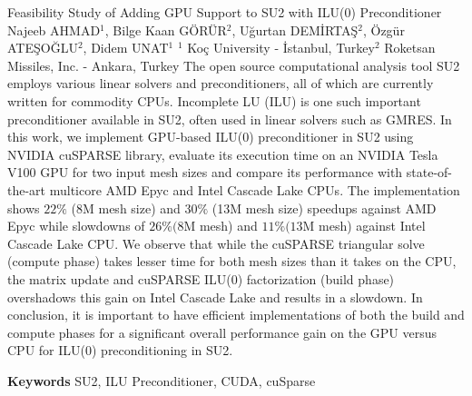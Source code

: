 
    \begin{abstract_online}{Feasibility Study of Adding GPU Support to SU2 with ILU(0) Preconditioner}{%
        Najeeb AHMAD$^{1}$, Bilge Kaan GÖRÜR$^{2}$, Uğurtan DEMİRTAŞ$^{2}$, Özgür ATEŞOĞLU$^{2}$, Didem UNAT$^{1}$}{%
        }{%
        $^1$ Koç University - İstanbul, Turkey\newline{}$^2$ Roketsan Missiles, Inc. - Ankara, Turkey}
    The open source computational analysis tool SU2 employs various linear solvers and preconditioners, all of which are currently written for commodity CPUs. Incomplete LU (ILU) is one such important preconditioner available in SU2, often used in linear solvers such as GMRES. In this work, we implement GPU-based ILU(0) preconditioner in SU2 using NVIDIA cuSPARSE library, evaluate its execution time on an NVIDIA Tesla V100 GPU for two input mesh sizes and compare its performance with state-of-the-art multicore AMD Epyc and Intel Cascade Lake CPUs. The implementation shows $22 \%$ (8M mesh size) and $30 \%$ (13M mesh size) speedups against AMD Epyc while slowdowns of $26 \%(8 \mathrm{M}$ mesh) and $11 \%(13 \mathrm{M}$ mesh) against Intel Cascade Lake CPU. We observe that while the cuSPARSE triangular solve (compute phase) takes lesser time for both mesh sizes than it takes on the CPU, the matrix update and cuSPARSE ILU(0) factorization (build phase) overshadows this gain on Intel Cascade Lake and results in a slowdown. In conclusion, it is important to have efficient implementations of both the build and compute phases for a significant overall performance gain on the GPU versus CPU for ILU(0) preconditioning in SU2. 
    
        \textbf{Keywords} \newline{}SU2, ILU Preconditioner, CUDA, cuSparse
    \end{abstract_online}
    
